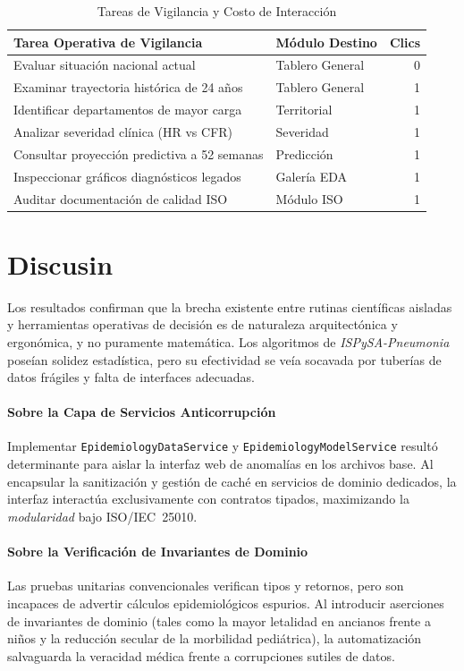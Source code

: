\documentclass[conference]{IEEEtran}
\begin{document}
\begin{table}[!t]
\caption{Tareas de Vigilancia y Costo de Interacci\'on}
\label{tab:tasks}
\centering
\footnotesize
\begin{tabular}{@{}p{3.7cm}p{1.6cm}r@{}}
\toprule
\textbf{Tarea Operativa de Vigilancia} & \textbf{M\'odulo Destino} & \textbf{Clics} \\
\midrule
Evaluar situaci\'on nacional actual & Tablero General & 0 \\
Examinar trayectoria hist\'orica de 24 a\~nos & Tablero General & 1 \\
Identificar departamentos de mayor carga & Territorial & 1 \\
Analizar severidad cl\'inica (HR vs CFR) & Severidad & 1 \\
Consultar proyecci\'on predictiva a 52 semanas & Predicci\'on & 1 \\
Inspeccionar gr\'aficos diagn\'osticos legados & Galer\'ia EDA & 1 \\
Auditar documentaci\'on de calidad ISO & M\'odulo ISO & 1 \\
\bottomrule
\end{tabular}
\end{table}

\section{Discusin}
\label{sec:discussion}

Los resultados confirman que la brecha existente entre rutinas cient\'ificas aisladas y herramientas operativas de decisi\'on es de naturaleza arquitect\'onica y ergon\'omica, y no puramente matem\'atica. Los algoritmos de \textit{ISPySA-Pneumonia} pose\'ian solidez estad\'istica, pero su efectividad se ve\'ia socavada por tuber\'ias de datos fr\'agiles y falta de interfaces adecuadas.

\paragraph{Sobre la Capa de Servicios Anticorrupci\'on}
Implementar \texttt{EpidemiologyDataService} y \texttt{EpidemiologyModelService} result\'o determinante para aislar la interfaz web de anomal\'ias en los archivos base. Al encapsular la sanitizaci\'on y gesti\'on de cach\'e en servicios de dominio dedicados, la interfaz interact\'ua exclusivamente con contratos tipados, maximizando la \textit{modularidad} bajo ISO/IEC~25010.

\paragraph{Sobre la Verificaci\'on de Invariantes de Dominio}
Las pruebas unitarias convencionales verifican tipos y retornos, pero son incapaces de advertir c\'alculos epidemiol\'ogicos espurios. Al introducir aserciones de invariantes de dominio (tales como la mayor letalidad en ancianos frente a ni\~nos y la reducci\'on secular de la morbilidad pedi\'atrica), la automatizaci\'on salvaguarda la veracidad m\'edica frente a corrupciones sutiles de datos.
\end{document}
